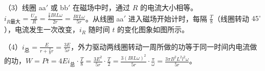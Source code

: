 \documentclass[\gkver]{gaokaozhenti}
\begin{document}
\begin{enumerate}
{\onepicture[w=4.02cm]{}

（3）线圈 aa$'$ 或 bb$'$ 在磁场中时，通过 $R$ 的电流大小相等。$i_{R\text{最大}}=\frac{U_{R}}{R}=\frac{\frac{2}{5}BlL\omega}{2r}=\frac{BlL\omega}{5r}$。从线圈 aa$'$ 进入磁场开始计时，每隔 $\frac{T}{8}$（线圈转动 $45^{\circ}$），电流发生一次改变，$i_{R}$ 随时间 $t$ 的变化图象如图所示。

\onepicture[w=5.81cm]{}

（4）$i_{\text{总}}=\frac{E}{r+\frac{2}{3}r}=\frac{3E}{5r}$，外力驱动两线圈转动一周所做的功等于同一时间内电流做的功，$W=Pt=4Ei_{\text{总}}\cdot\frac{T}{8}=\frac{3E^{2}}{5r}\cdot\frac{T}{2}=\frac{3(BlL\omega)^{2}}{5r}\cdot\frac{\pi}{\omega}=\frac{3\pi B^{2}L^{2}l^{2}\omega}{5r}$。
}

\end{enumerate}
\end{document}
